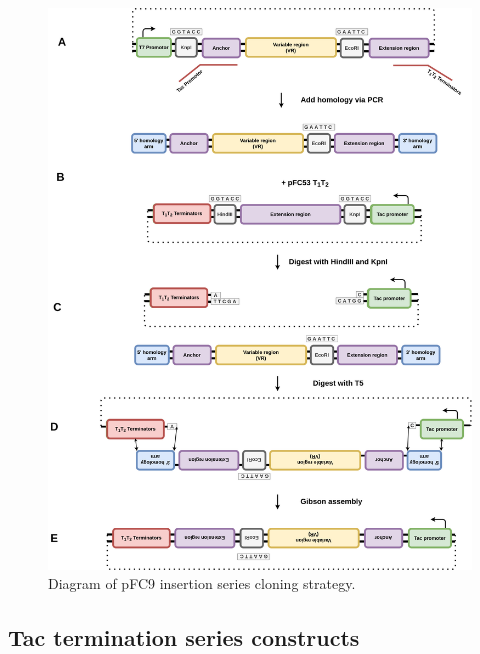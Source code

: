 \documentclass[11pt]{article}
\begin{document}
\begin{figure}[H]
	\includegraphics[width=15cm]{images/cloning_diagrams/construct_diagrams-Tac-initiation-series.png}
	\centering
	\caption{Diagram of pFC9 insertion series cloning strategy.}
\end{figure}

\subsection{Tac termination series constructs}
\end{document}
